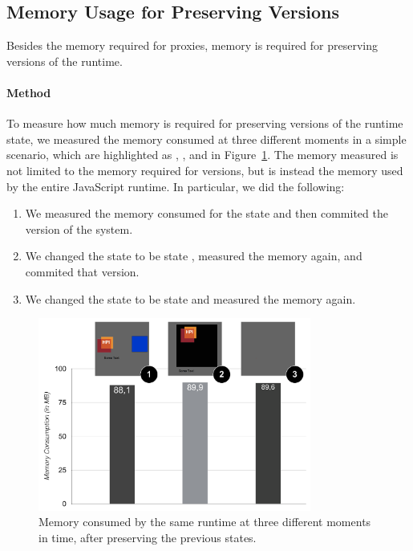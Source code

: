 \subsection{Memory Usage for Preserving Versions}

Besides the memory required for proxies, memory is required for preserving versions of the runtime.

\paragraph{Method}
To measure how much memory is required for preserving versions of the runtime state, we measured the memory consumed at three different moments in a simple scenario, which are highlighted as , , and  in Figure~\ref{fig:MemoryOverheadForVersions}.
The memory measured is not limited to the memory required for versions, but is instead the memory used by the entire JavaScript runtime.
In particular, we did the following:
\begin{enumerate}
    \item We measured the memory consumed for the state  and then commited the version of the system.
    \item We changed the state to be state , measured the memory again, and commited that version.
    \item We changed the state to be state  and measured the memory again.
\end{enumerate}

\begin{figure}[h!]
    \centering
    \includegraphics[width=0.8\textwidth]{figures/6_evaluation/2_memoryForVersions.pdf}
    \caption{Memory consumed by the same runtime at three different moments in time, after preserving the previous states.}
    \label{fig:MemoryOverheadForVersions}
\end{figure}

